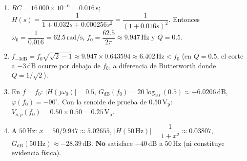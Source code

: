 \documentclass[10pt, a4paper]{article}
\begin{document}
\begin{enumerate}
    \setlength{\itemsep}{2pt}
    \item $RC = 16\,000 \times 10^{-6} = 0.016\,\mathrm{s}$; $H(s) = \dfrac{1}{1 + 0.032s + 0.000256s^2} = \dfrac{1}{(1 + 0.016s)^2}$. Entonces $\omega_0 = \dfrac{1}{0.016} = 62.5\,\mathrm{rad/s}$, $f_0 = \dfrac{62.5}{2\pi} \approx 9.947\,\mathrm{Hz}$ y $Q = 0.5$.
    \item $f_{-3\mathrm{dB}} = f_0\sqrt{\sqrt{2} - 1} \approx 9.947 \times 0.643594 \approx 6.402\,\mathrm{Hz} < f_0$ (en $Q = 0.5$, el corte a $-3\,\mathrm{dB}$ ocurre por debajo de $f_0$, a diferencia de Butterworth donde $Q = 1/\sqrt{2}$).
    \item En $f = f_0$: $|H(j\omega_0)| = 0.5$, $G_{\mathrm{dB}}(f_0) = 20\log_{10}(0.5) \approx -6.0206\,\mathrm{dB}$, $\varphi(f_0) = -90^\circ$. Con la senoide de prueba de $0.50\,\mathrm{V_p}$: $V_{o,p}(f_0) = 0.50 \times 0.50 = 0.25\,\mathrm{V_p}$.
    \item A $50\,\mathrm{Hz}$: $x = 50 / 9.947 \approx 5.02655$, $|H(50\,\mathrm{Hz})| = \dfrac{1}{1 + x^2} \approx 0.03807$, $G_{\mathrm{dB}}(50\,\mathrm{Hz}) \approx -28.39\,\mathrm{dB}$. \textbf{No} satisface $-40\,\mathrm{dB}$ a $50\,\mathrm{Hz}$ (ni constituye evidencia física).
\end{enumerate}
\end{document}
